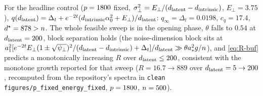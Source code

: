 \begin{corollary}\label{cor:fixedenergy-buf}
For the headline control ($p=1800$ fixed, $\sigma_{\perp}^2=E_\perp/(d_{\mathrm{latent}}-d_{\mathrm{intrinsic}})$, $E_\perp=3.75$), $q(d_{\mathrm{latent}})=\Delta_t+e^{-2t}(d_{\mathrm{intrinsic}}\alpha_0^2+E_\perp)/d_{\mathrm{latent}}$: $q_\infty=\Delta_t=0.0198$, $c_q=17.4$, $d^\star=878>n$. The whole feasible sweep is in the opening phase, $\theta$ falls to $0.54$ at $d_{\mathrm{latent}}=200$, block separation holds (the noise-dimension block sits at $a_1^2[e^{-2t}E_\perp(1\pm\sqrt{\psi_\perp})^2/(d_{\mathrm{latent}}-d_{\mathrm{intrinsic}})+\Delta_t]/d_{\mathrm{latent}}\gg\theta a_*^2g/n$), and \eqref{eq:R-buf} predicts a monotonically increasing $R$ over $d_{\mathrm{latent}}\le200$, consistent with the monotone growth reported for that sweep ($R=16.7\to889$ over $d_{\mathrm{latent}}=5\to200$, recomputed from the repository's spectra in \texttt{clean figures/p\_fixed\_energy\_fixed}, $p=1800$, $n=500$).
\end{corollary}

